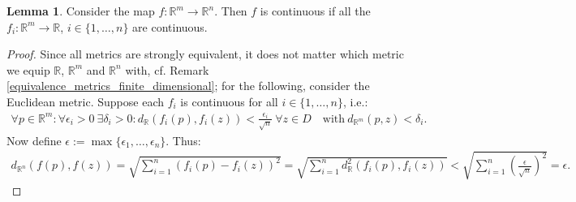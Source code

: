 \documentclass[12pt, a4paper]{article}
\numberwithin{equation}{section}
\theoremstyle{definition}
\theoremstyle{definition}
\newtheorem{lemma}[thm]{Lemma} %
\begin{document}
	\begin{lemma}\label{continuity_vector_components}
		Consider the map $f: \mathbb R^m\rightarrow\mathbb R^n$. Then $f$ is continuous if all the $f_i: \mathbb R^m\rightarrow\mathbb R$, $i\in\{1, \dots, n\}$ are continuous. 
	\end{lemma}
	\begin{proof}
		Since all metrics are strongly equivalent, it does not matter which metric we equip $\mathbb R$, $\mathbb R^m$ and $\mathbb R^n$ with, cf. Remark \ref{equivalence_metrics_finite_dimensional}; for the following, consider the Euclidean metric. Suppose each $f_i$ is continuous for all $i\in \{1, \dots, n\}$, i.e.: 
		\begin{align} 
			\forall p\in\mathbb R^m: \forall \epsilon_i > 0 \ \exists 
			\delta_i>0: d_{\mathbb R}(f_i(p), f_i(z)) < \frac{\epsilon_i}{\sqrt{n}} \ \forall z\in D \quad \text{with}\ d_{\mathbb R^m}(p, z) < \delta_i. 
		\end{align} 
		Now define $\epsilon:= \max\{\epsilon_1, \dots, \epsilon_n\}$. Thus: 
		\begin{align}
			d_{\mathbb R^n}(f(p), f(z)) = \sqrt{\sum_{i=1}^{n}\left(f_i(p)-f_i(z)\right)^2} 
			= \sqrt{\sum_{i=1}^{n}d^2_{\mathbb R}\left(f_i(p), f_i(z)\right)} < \sqrt{\sum_{i=1}^{n}\left(\frac{\epsilon}{\sqrt{n}}\right)^2} = \epsilon. 
		\end{align}
	\end{proof}
	
\end{document}
